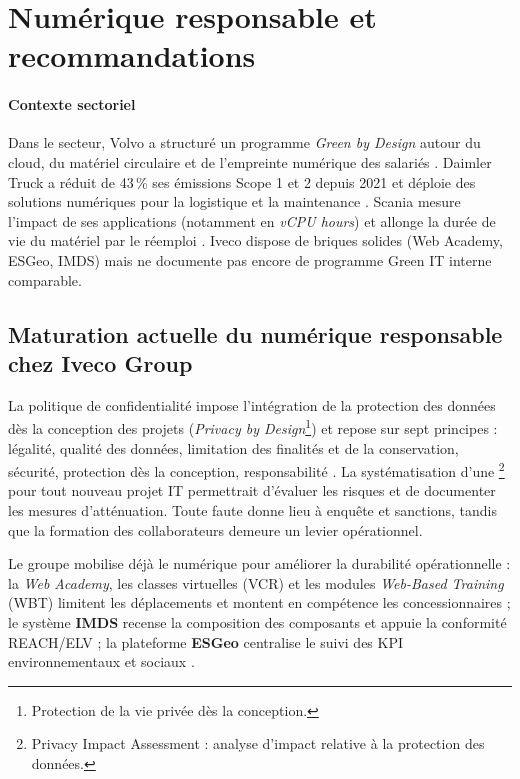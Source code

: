 \section{Numérique responsable et recommandations}

\paragraph{Contexte sectoriel}

Dans le secteur, Volvo a structuré un programme \textit{Green by Design} autour du cloud, du matériel circulaire et de l'empreinte numérique des salariés \cite{volvo_green_it_2026}. Daimler Truck a réduit de 43\,\% ses émissions Scope 1 et 2 depuis 2021 et déploie des solutions numériques pour la logistique et la maintenance \cite{daimler_esg_2025}. Scania mesure l'impact de ses applications (notamment en \textit{vCPU hours}) et allonge la durée de vie du matériel par le réemploi \cite{scania_it_green_2025}. Iveco dispose de briques solides (Web Academy, ESGeo, IMDS) mais ne documente pas encore de programme Green IT interne comparable.

\subsection{Maturation actuelle du numérique responsable chez Iveco Group}

La politique de confidentialité impose l'intégration de la protection des données dès la conception des projets (\textit{Privacy by Design}\footnote{Protection de la vie privée dès la conception.}) et repose sur sept principes : légalité, qualité des données, limitation des finalités et de la conservation, sécurité, protection dès la conception, responsabilité \cite{iveco_privacy_2025}. La systématisation d'une \footnote{Privacy Impact Assessment : analyse d'impact relative à la protection des données.} pour tout nouveau projet IT permettrait d'évaluer les risques et de documenter les mesures d'atténuation. Toute faute donne lieu à enquête et sanctions, tandis que la formation des collaborateurs demeure un levier opérationnel.

Le groupe mobilise déjà le numérique pour améliorer la durabilité opérationnelle : la \textit{Web Academy}, les classes virtuelles (VCR) et les modules \textit{Web-Based Training} (WBT) limitent les déplacements et montent en compétence les concessionnaires \cite{iveco_annual_2025}; le système \textbf{IMDS} recense la composition des composants et appuie la conformité REACH/ELV \cite{iveco_sustainability_inaction_2025}; la plateforme \textbf{ESGeo} centralise le suivi des KPI environnementaux et sociaux \cite{iveco_annual_2025}.

